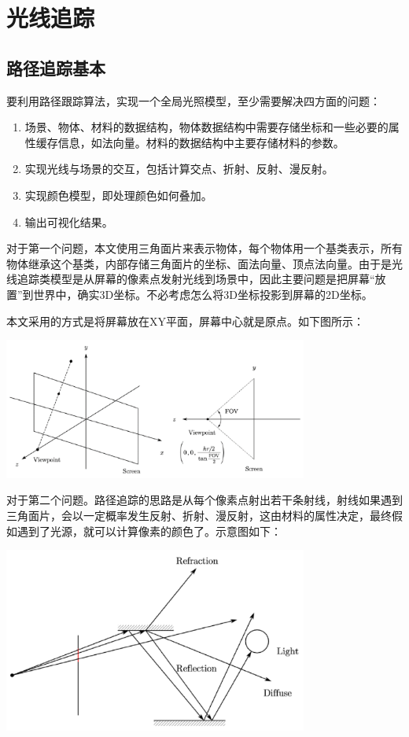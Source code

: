 \section{光线追踪}
\subsection{路径追踪基本}
要利用路径跟踪算法，实现一个全局光照模型，至少需要解决四方面的问题：
\begin{enumerate}
\item 场景、物体、材料的数据结构，物体数据结构中需要存储坐标和一些必要的属性缓存信息，如法向量。材料的数据结构中主要存储材料的参数。
\item 实现光线与场景的交互，包括计算交点、折射、反射、漫反射。
\item 实现颜色模型，即处理颜色如何叠加。
\item 输出可视化结果。
\end{enumerate}

对于第一个问题，本文使用三角面片来表示物体，每个物体用一个基类表示，所有物体继承这个基类，内部存储三角面片的坐标、面法向量、顶点法向量。由于是光线追踪类模型是从屏幕的像素点发射光线到场景中，因此主要问题是把屏幕“放置”到世界中，确实3D坐标。不必考虑怎么将3D坐标投影到屏幕的2D坐标。

本文采用的方式是将屏幕放在XY平面，屏幕中心就是原点。如下图所示：

\begin{center}
\includegraphics[width=10cm]{figure/screen.png}
\end{center}

对于第二个问题。路径追踪的思路是从每个像素点射出若干条射线，射线如果遇到三角面片，会以一定概率发生反射、折射、漫反射，这由材料的属性决定，最终假如遇到了光源，就可以计算像素的颜色了。示意图如下：

\begin{center}
\includegraphics[width=10cm]{figure/path tracing.png}
\end{center}

